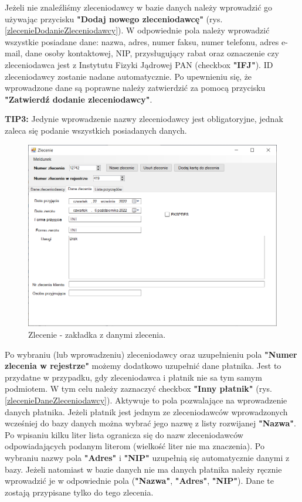 Jeżeli nie znaleźliśmy zleceniodawcy w bazie danych należy wprowadzić go używając przycisku \textbf{"Dodaj nowego zleceniodawcę"} (rys. \ref{zlecenieDodanieZleceniodawcy}). W odpowiednie pola należy wprowadzić wszystkie posiadane dane: nazwa, adres, numer faksu, numer telefonu, adres e-mail, dane osoby kontaktowej, NIP, przysługujący rabat oraz oznaczenie czy zleceniodawca jest z Instytutu Fizyki Jądrowej PAN (checkbox  \textbf{"IFJ"}). ID zleceniodawcy zostanie nadane automatycznie. Po upewnieniu się, że wprowadzone dane są poprawne należy zatwierdzić za pomocą przycisku \textbf{"Zatwierdź dodanie zleceniodawcy"}.

\textbf{TIP3:} Jedynie wprowadzenie nazwy zleceniodawcy jest obligatoryjne, jednak zaleca się podanie wszystkich posiadanych danych.

\begin{figure}[htb]
	\centering
	\includegraphics[width=\columnwidth]{obrazki/Biuro/zlecenie/zlecenie_dane_zlecenia.png}
	\caption{Zlecenie - zakładka z danymi zlecenia.}
	\label{zlecenieDaneZlecenia}
\end{figure}

Po wybraniu (lub wprowadzeniu) zleceniodawcy oraz uzupełnieniu pola \textbf{"Numer zlecenia w rejestrze"} możemy dodatkowo uzupełnić dane płatnika. Jest to przydatne w przypadku, gdy zleceniodawca i płatnik nie sa tym samym podmiotem. W tym celu należy zaznaczyć checkbox \textbf{"Inny płatnik"} (rys. \ref{zlecenieDaneZleceniodawcy}). Aktywuje to pola pozwalające na wprowadzenie danych płatnika. Jeżeli płatnik jest jednym ze zleceniodawców wprowadzonych wcześniej do bazy danych można wybrać jego nazwę z listy rozwijanej \textbf{"Nazwa"}. Po wpisaniu kilku liter lista ogranicza się do nazw zleceniodawców odpowiadających podanym literom (wielkość liter nie ma znaczenia). Po wybraniu nazwy pola \textbf{"Adres"} i \textbf{"NIP"} uzupełnią się automatycznie danymi z bazy. Jeżeli natomiast w bazie danych nie ma danych płatnika należy ręcznie wprowadzić je w odpowiednie pola (\textbf{"Nazwa"}, \textbf{"Adres"}, \textbf{"NIP"}). Dane te zostają przypisane tylko do tego zlecenia.

